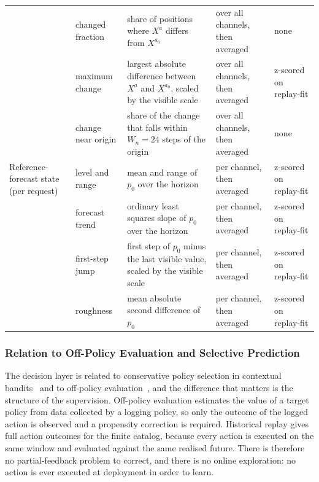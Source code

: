 \documentclass{article}
\begin{document}
\begin{table}[h]
{\begin{tabular}{@{}l p{} p{} p{} p{}@{}}
     & changed fraction & share of positions where $X^{a}$ differs from $X^{a_0}$ & over all channels, then averaged & none \\
     & maximum change & largest absolute difference between $X^{a}$ and $X^{a_0}$, scaled by the visible scale & over all channels, then averaged & z-scored on replay-fit \\
     & change near origin & share of the change that falls within $W_n = 24$ steps of the origin & over all channels, then averaged & none \\
    \midrule
    Reference-forecast state (per request) & level and range & mean and range of $p_0$ over the horizon & per channel, then averaged & z-scored on replay-fit \\
     & forecast trend & ordinary least squares slope of $p_0$ over the horizon & per channel, then averaged & z-scored on replay-fit \\
     & first-step jump & first step of $p_0$ minus the last visible value, scaled by the visible scale & per channel, then averaged & z-scored on replay-fit \\
     & roughness & mean absolute second difference of $p_0$ & per channel, then averaged & z-scored on replay-fit \\
    \bottomrule
  \end{tabular}}
\end{table}

\subsubsection{Relation to Off-Policy Evaluation and Selective Prediction}
\label{app:ope-positioning}
The decision layer is related to conservative policy selection in contextual
bandits~\citep{abbasiyadkori2011improved,lattimore2020bandit} and to off-policy
evaluation~\citep{strehl2010learning,dudik2011doubly,swaminathan2015counterfactual,
jiang2016doubly,thomas2016data}, and the difference that matters is the structure of the
supervision. Off-policy evaluation estimates the value of a target policy from data collected
by a logging policy, so only the outcome of the logged action is observed and a propensity
correction is required. Historical replay gives full action outcomes for the finite catalog,
because every action is executed on the same window and evaluated against the same realised
future. There is therefore no partial-feedback problem to correct, and there is no online
exploration: no action is ever executed at deployment in order to learn.
\end{document}
